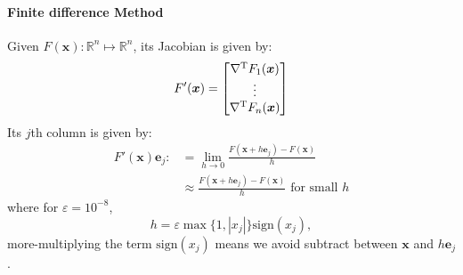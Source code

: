 \paragraph{Finite difference Method}
Given $F(\bm x): \mathbb{R}^n\mapsto\mathbb{R}^n$, its Jacobian is given by:
\[
F'(\bm x)=\begin{bmatrix}
\nabla^{\mathrm T} F_1(\bm x)\\
\vdots\\
\nabla^{\mathrm T} F_n(\bm x)
\end{bmatrix}
\]
Its $j$th column is given by:
\begin{align*}
F'(\bm x)\bm e_j:&=\lim_{h\to0}\frac{F(\bm x+h\bm e_j) - F(\bm x)}{h}\\
&\approx \frac{F(\bm x+h\bm e_j) - F(\bm x)}{h}\mbox{ for small }h
\end{align*}
where for $\varepsilon=10^{-8}$,
\[
h=\varepsilon\max\{1,|x_j|\}\mbox{sign}(x_j),
\]
more-multiplying the term $\mbox{sign}(x_j)$ means we avoid subtract between $\bm x$ and $h\bm e_j$.



















